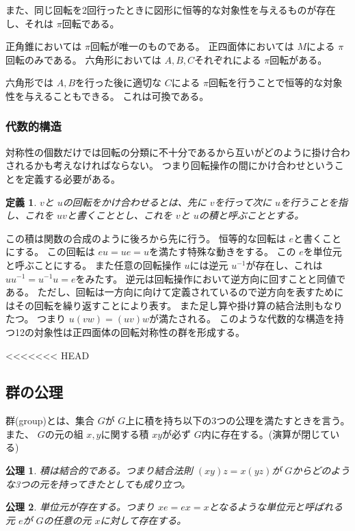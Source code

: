 \documentclass[dvipdfmx]{jsarticle}
\newtheorem{defi}{定義}
\newtheorem{axio}{公理}
\begin{document}
また、同じ回転を2回行ったときに図形に恒等的な対象性を与えるものが存在し、それは $\pi$回転である。

正角錐においては $\pi$回転が唯一のものである。
正四面体においては $M$による $\pi$回転のみである。
六角形においては $A,B,C$それぞれによる $\pi$回転がある。

六角形では $A,B$を行った後に適切な $C$による $\pi$回転を行うことで恒等的な対象性を与えることもできる。
これは可換である。

\subsubsection{代数的構造}
対称性の個数だけでは回転の分類に不十分であるから互いがどのように掛け合わされるかも考えなければならない。
つまり回転操作の間にかけ合わせということを定義する必要がある。

\begin{defi}
$v$と $u$の回転をかけ合わせるとは、先に $v$を行って次に $u$を行うことを指し、これを $uv$と書くこととし、これを $v$と $u$の積と呼ぶこととする。
\end{defi}

この積は関数の合成のように後ろから先に行う。
恒等的な回転は $e$と書くことにする。
この回転は $eu = ue = u$を満たす特殊な動きをする。
この $e$を単位元と呼ぶことにする。
また任意の回転操作 $u$には逆元 $u^{-1}$が存在し、これは
$uu^{-1} = u^{-1}u = e$をみたす。
逆元は回転操作において逆方向に回すことと同値である。
ただし、回転は一方向に向けて定義されているので逆方向を表すためにはその回転を繰り返すことにより表す。
また足し算や掛け算の結合法則もなりたつ。
つまり $u(vw) = (uv)w$が満たされる。
このような代数的な構造を持つ12の対象性は正四面体の回転対称性の群を形成する。

<<<<<<< HEAD
\subsection{群の公理}

群(group)とは、集合 $G$が $G$上に積を持ち以下の3つの公理を満たすときを言う。
また、 $G$の元の組 $x,y$に関する積 $xy$が必ず $G$内に存在する。(演算が閉じている)

\begin{axio}
  積は結合的である。つまり結合法則 $(xy)z = x(yz)$が $G$からどのような3つの元を持ってきたとしても成り立つ。
\end{axio}

\begin{axio}
  単位元が存在する。つまり $xe = ex =x$となるような単位元と呼ばれる元 $e$が $G$の任意の元 $x$に対して存在する。
\end{axio}
\end{document}
